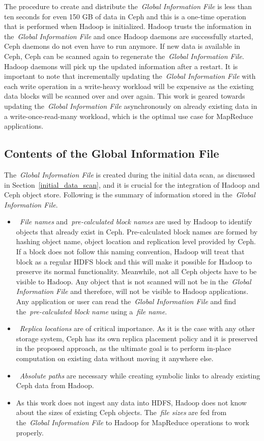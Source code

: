 The procedure to create and distribute the~\textit{Global Information File} is less than ten seconds
for even 150 GB of data in Ceph and this is a one-time operation that is performed when Hadoop is initialized.
Hadoop trusts the information in the~\textit{Global Information File} and once Hadoop daemons are successfully
started, Ceph daemons do not even have to run anymore. If new data is available in Ceph, Ceph can be scanned
again to regenerate the~\textit{Global Information File}. Hadoop daemons will pick up the updated
information after a restart. It is important to note that incrementally updating the~\textit{Global Information File}
with each write operation in a write-heavy workload will be expensive as the existing data blocks will be scanned over and over
again. This work is geared towards updating the~\textit{Global Information File} asynchronously on already existing
data in a write-once-read-many workload, which is the optimal use case for MapReduce applications.

\subsection{Contents of the Global Information File}
\label{global_file_contents}
The~\textit{Global Information File} is created during the initial data scan, as discussed in Section~\ref{initial_data_scan},
and it is crucial for the integration of Hadoop and Ceph object store. Following is the summary of information
stored in the~\textit{Global Information File}.
\begin{itemize}
\item~\textit{File names} and~\textit{pre-calculated block names} are used by Hadoop to identify
objects that already exist in Ceph. Pre-calculated block names are formed by hashing object name, object
location and replication level provided by Ceph. If a block does not follow this naming convention,
Hadoop will treat that block as a regular HDFS block and this will make it possible for Hadoop to
preserve its normal functionality. Meanwhile, not all Ceph objects have to be visible to Hadoop.
Any object that is not scanned will not be in the~\textit{Global Information File} and therefore,
will not be visible to Hadoop applications. Any application or user can read the~\textit{Global
Information File} and find the~\textit{pre-calculated block name} using a~\textit{file name}.
\item~\textit{Replica locations} are of critical importance. As it is the case with any other storage
system, Ceph has its own replica placement policy and it is preserved in the proposed approach,
as the ultimate goal is to perform in-place computation on existing data without moving it anywhere
else.
\item~\textit{Absolute paths} are necessary while creating symbolic links to already existing Ceph data from
Hadoop.
\item As this work does not ingest any data into HDFS, Hadoop does not know about the sizes of
existing Ceph objects. The~\textit{file sizes} are fed from the~\textit{Global Information File} to
Hadoop for MapReduce operations to work properly.
\end{itemize}

